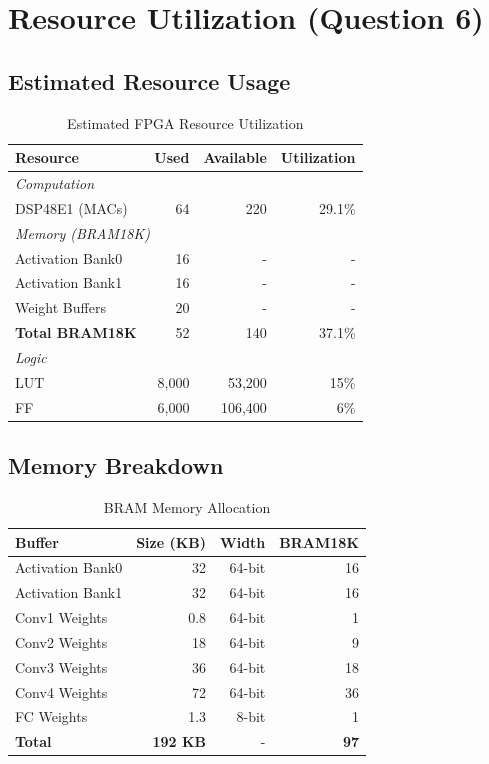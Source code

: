 \documentclass[11pt,a4paper]{article}
\begin{document}
\section{Resource Utilization (Question 6)}

\subsection{Estimated Resource Usage}

\begin{table}[H]
\centering
\caption{Estimated FPGA Resource Utilization}
\begin{tabular}{lrrr}
\toprule
\textbf{Resource} & \textbf{Used} & \textbf{Available} & \textbf{Utilization} \\
\midrule
\multicolumn{4}{l}{\textit{Computation}} \\
DSP48E1 (MACs) & 64 & 220 & 29.1\% \\
\midrule
\multicolumn{4}{l}{\textit{Memory (BRAM18K)}} \\
Activation Bank0 & 16 & - & - \\
Activation Bank1 & 16 & - & - \\
Weight Buffers & ~20 & - & - \\
\textbf{Total BRAM18K} & ~52 & 140 & 37.1\% \\
\midrule
\multicolumn{4}{l}{\textit{Logic}} \\
LUT & ~8,000 & 53,200 & ~15\% \\
FF & ~6,000 & 106,400 & ~6\% \\
\bottomrule
\end{tabular}
\end{table}

\subsection{Memory Breakdown}

\begin{table}[H]
\centering
\caption{BRAM Memory Allocation}
\begin{tabular}{lrrr}
\toprule
\textbf{Buffer} & \textbf{Size (KB)} & \textbf{Width} & \textbf{BRAM18K} \\
\midrule
Activation Bank0 & 32 & 64-bit & 16 \\
Activation Bank1 & 32 & 64-bit & 16 \\
Conv1 Weights & 0.8 & 64-bit & 1 \\
Conv2 Weights & 18 & 64-bit & 9 \\
Conv3 Weights & 36 & 64-bit & 18 \\
Conv4 Weights & 72 & 64-bit & 36 \\
FC Weights & 1.3 & 8-bit & 1 \\
\midrule
\textbf{Total} & \textbf{~192 KB} & - & \textbf{~97} \\
\bottomrule
\end{tabular}
\end{table}
\end{document}
